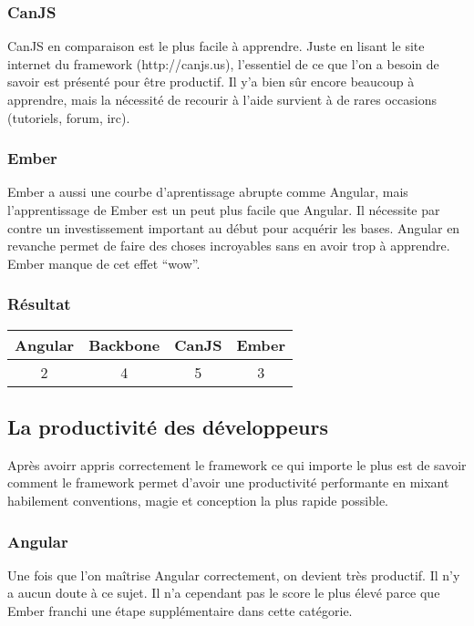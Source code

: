 \subsubsection{CanJS} 

CanJS en comparaison est le plus facile à apprendre. Juste en lisant le site internet du framework (http://canjs.us), l’essentiel de ce que l’on a besoin de savoir est présenté pour être productif. Il y’a bien sûr encore beaucoup à apprendre, mais la nécessité de recourir à l’aide survient à de rares occasions (tutoriels, forum, irc).

\subsubsection{Ember}

Ember a aussi une courbe d’aprentissage abrupte comme Angular, mais l’apprentissage de Ember est un peut plus facile que Angular. Il nécessite par contre un investissement important au début pour acquérir les bases. Angular en revanche permet de faire des choses incroyables sans en avoir trop à apprendre. Ember manque de cet effet “wow”.


\subsubsection{Résultat}
\begin{tabular}{|c|c|c|c|}
  \hline 
  Angular & Backbone & CanJS & Ember \\
  \hline 
  2 & 4 & 5 & 3 \\
  \hline
\end{tabular}


\subsection{La productivité des développeurs}

Après avoirr appris correctement le framework ce qui importe le plus est de savoir comment le framework permet d’avoir une productivité performante en mixant habilement conventions, magie et conception la plus rapide possible.

\subsubsection{Angular}

Une fois que l’on maîtrise Angular correctement, on devient très productif. Il n'y a aucun doute à ce sujet. Il n’a cependant pas le score le plus élevé parce que Ember franchi une étape supplémentaire dans cette catégorie.


